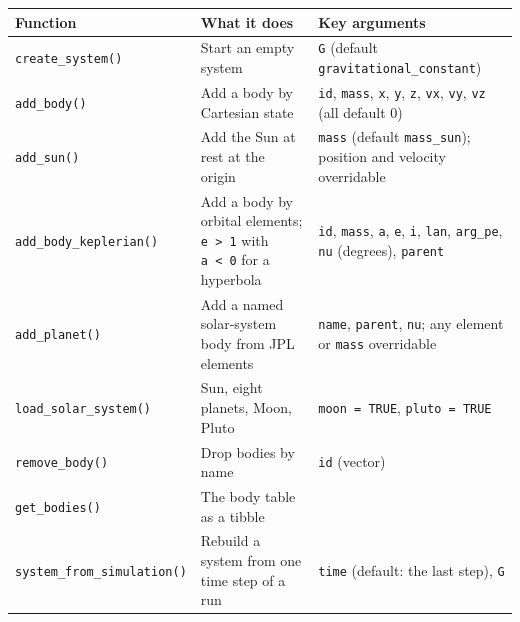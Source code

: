 \documentclass[
  10.5pt,
  letterpaper,
]{scrbook}
\newcounter{none} %
\theoremstyle{plain}
\theoremstyle{remark}
\begin{document}
{\def\LTcaptype{none} %
\begin{longtable}[]{@{}
  >{\raggedright\arraybackslash}p{}
  >{\raggedright\arraybackslash}p{}
  >{\raggedright\arraybackslash}p{}@{}}
\toprule\noalign{}
\begin{minipage}[b]{\linewidth}\raggedright
Function
\end{minipage} & \begin{minipage}[b]{\linewidth}\raggedright
What it does
\end{minipage} & \begin{minipage}[b]{\linewidth}\raggedright
Key arguments
\end{minipage} \\
\midrule\noalign{}
\endhead
\bottomrule\noalign{}
\endlastfoot
\texttt{create\_system()} & Start an empty system & \texttt{G} (default
\texttt{gravitational\_constant}) \\
\texttt{add\_body()} & Add a body by Cartesian state & \texttt{id},
\texttt{mass}, \texttt{x}, \texttt{y}, \texttt{z}, \texttt{vx},
\texttt{vy}, \texttt{vz} (all default 0) \\
\texttt{add\_sun()} & Add the Sun at rest at the origin & \texttt{mass}
(default \texttt{mass\_sun}); position and velocity overridable \\
\texttt{add\_body\_keplerian()} & Add a body by orbital elements;
\texttt{e\ \textgreater{}\ 1} with \texttt{a\ \textless{}\ 0} for a
hyperbola & \texttt{id}, \texttt{mass}, \texttt{a}, \texttt{e},
\texttt{i}, \texttt{lan}, \texttt{arg\_pe}, \texttt{nu} (degrees),
\texttt{parent} \\
\texttt{add\_planet()} & Add a named solar-system body from JPL elements
& \texttt{name}, \texttt{parent}, \texttt{nu}; any element or
\texttt{mass} overridable \\
\texttt{load\_solar\_system()} & Sun, eight planets, Moon, Pluto &
\texttt{moon\ =\ TRUE}, \texttt{pluto\ =\ TRUE} \\
\texttt{remove\_body()} & Drop bodies by name & \texttt{id} (vector) \\
\texttt{get\_bodies()} & The body table as a tibble & \\
\texttt{system\_from\_simulation()} & Rebuild a system from one time
step of a run & \texttt{time} (default: the last step), \texttt{G} \\
\end{longtable}
}
\end{document}
